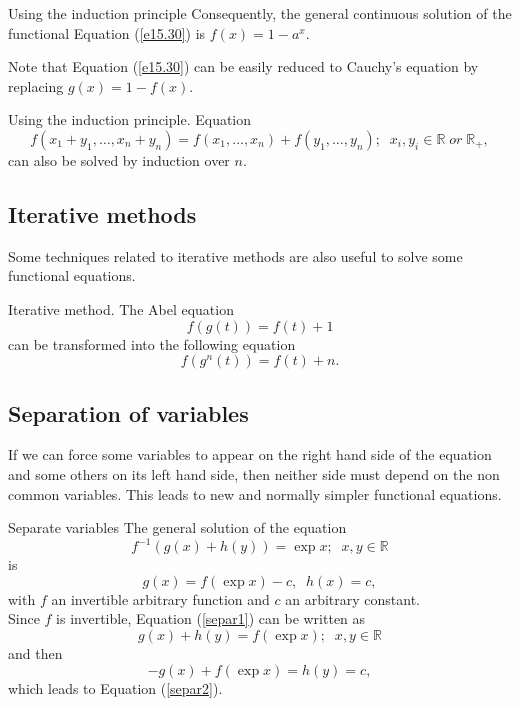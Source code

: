 \documentclass[
	11pt, %
	fleqn, %
	a4paper, %
]{LegrandOrangeBook}
\newcommand{\R}{\mathbb{R}}
\begin{document}
\begin{example}{Using the induction principle}
Consequently, the general continuous solution of the functional
Equation (\ref{e15.30}) is $f(x)=1-a^x$.

Note that Equation (\ref{e15.30}) can be easily reduced to
Cauchy's equation by replacing $g(x)=1-f(x)$.
\end{example}

\begin{example}{Using the induction principle. }
Equation
\begin{displaymath}
f(x_1+y_1,\dots ,x_n+y_n)= f(x_1,\dots ,x_n)+f(y_1,\dots
,y_n);\;\; x_i,y_i\in\R  \; or \; \R _+,
\end{displaymath}
can also be solved by induction over $n$.
\end{example}


\subsection{Iterative methods}\label{s2.8}
Some techniques related to iterative methods are also useful to solve some functional equations.

\begin{example}{Iterative method. }\label{Abelequ}
The Abel equation
\begin{displaymath}
f(g(t))=f(t)+1
\end{displaymath}
can be transformed into the following equation
\begin{displaymath}
f(g^n(t))=f(t)+n.
\end{displaymath}
\end{example}

\subsection{Separation of variables}\label{s2.9} 
If we can force some variables to appear on the right hand side of
the equation and some others on its left hand side, then neither
side must depend on the non common variables. This leads to new
and normally simpler functional equations.

\begin{example}{Separate variables}
The general solution of the equation
\begin{equation}\label{separ1}
f^{-1}(g(x)+h(y))=\exp x  ;\;\;x,y \in \R
\end{equation}
is
\begin{equation}\label{separ2}
g(x)=f(\exp x)-c ,\;\;h(x)=c,
\end{equation}
with $f$ an invertible arbitrary function and $c$ an arbitrary
constant.\\

 Since $f$ is invertible, Equation
(\ref{separ1}) can be written as
\begin{displaymath}
g(x)+h(y)=f(\exp x);\;\;x,y \in \R
\end{displaymath}
and then
\begin{displaymath}
-g(x)+f(\exp x) = h(y)=c,
\end{displaymath}
which leads to Equation (\ref{separ2}).
\end{example}
\end{document}
